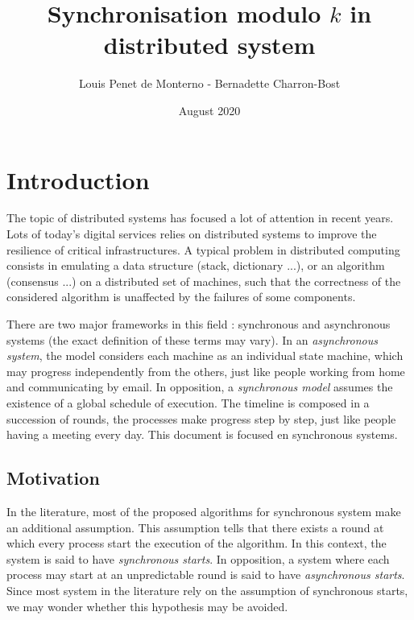 \documentclass{article}
\title{Synchronisation modulo $k$ in distributed system}
\date{August 2020}
\author{Louis Penet de Monterno - Bernadette Charron-Bost}
\begin{document}
\maketitle

\section{Introduction}

The topic of distributed systems has focused a lot of attention in recent years.
Lots of today's digital services relies on distributed systems to improve the resilience of critical infrastructures.
A typical problem in distributed computing consists in emulating a data structure (stack, dictionary ...), or an algorithm (consensus ...) on a distributed
set of machines, such that the correctness of the considered algorithm is unaffected by the failures of some components.

There are two major frameworks in this field : synchronous and asynchronous systems (the exact definition of these terms may vary).
In an \emph{asynchronous system}, the model considers each machine as an individual state machine, which may progress independently from the others,
just like people working from home and communicating by email.
In opposition, a \emph{synchronous model} assumes the existence of a global schedule of execution.
The timeline is composed in a succession of rounds, the processes make progress step by step,
just like people having a meeting every day.
This document is focused en synchronous systems.


\subsection{Motivation}

In the literature, most of the proposed algorithms for synchronous system make an additional assumption.
This assumption tells that there exists a round at which every process start the execution of the algorithm.
In this context, the system is said to have \emph{synchronous starts}.
In opposition, a system where each process may start at an unpredictable round is said to have \emph{asynchronous starts}.
Since most system in the literature rely on the assumption of synchronous starts, we may wonder whether this hypothesis may be avoided.
\end{document}
